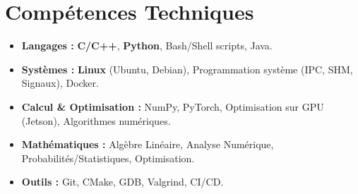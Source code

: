 \documentclass[a4paper,11pt]{article}
\begin{document}
\section{Compétences Techniques}
\begin{itemize}[leftmargin=*, nosep]
    \item \small{\textbf{Langages :} \textbf{C/C++}, \textbf{Python}, Bash/Shell scripts, Java.}
    \item \small{\textbf{Systèmes :} \textbf{Linux} (Ubuntu, Debian), Programmation système (IPC, SHM, Signaux), Docker.}
    \item \small{\textbf{Calcul \& Optimisation :} NumPy, PyTorch, Optimisation sur GPU (Jetson), Algorithmes numériques.}
    \item \small{\textbf{Mathématiques :} Algèbre Linéaire, Analyse Numérique, Probabilités/Statistiques, Optimisation.}
    \item \small{\textbf{Outils :} Git, CMake, GDB, Valgrind, CI/CD.}
\end{itemize}

\end{document}
